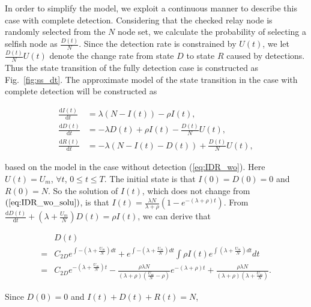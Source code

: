 In order to simplify the model,
we exploit a continuous manner to
describe this case with complete detection.
Considering that the checked relay node
is randomly selected from the $N$ node set,
we calculate the probability of selecting a selfish node
as $\frac{D(t)}{N}$.
Since the detection rate is constrained by $U(t)$,
we let $\frac{D(t)}{N}U(t)$ denote
the change rate from state $D$ to state $R$ caused by detections.
Thus the state transition of the fully detection case
is constructed as Fig.~\ref{fig:ss_dt}.
The approximate model of the state transition in the case with complete detection
will be constructed as
\begin{small}
\begin{equation}
\label{eq:IDR_full}
\begin{aligned}
\frac{\mathrm{d} I(t)}{\mathrm{d} t} &=  \lambda (N-I(t)) - \rho I(t),\\
\frac{\mathrm{d} D(t)}{\mathrm{d} t} &= - \lambda D(t) + \rho I(t) - \frac{D(t)}{N} U(t),\\
\frac{\mathrm{d} R(t)}{\mathrm{d} t} &= - \lambda (N-I(t)-D(t)) + \frac{D(t)}{N} U(t),
\end{aligned}
\end{equation}
\end{small}
based on the model in the case without detection (\ref{eq:IDR_wo}).
Here $U(t) = U_{m}$, $\forall t$, $0 \le t \le T$.
The initial state is that $I(0)=D(0)=0$ and $R(0)=N$.
So the solution of $I(t)$, which does not change from $(\ref{eq:IDR_wo_solu})$,
is that $I(t) = \frac{ \lambda N }{ \lambda + \rho }(1- e^{-(\lambda + \rho)t})$.
From $\frac{\mathrm{d} D(t)}{\mathrm{d} t} + (\lambda + \frac{U_{m}}{N}) D(t)= \rho I(t)$,
we can derive that
\begin{small}
\begin{equation}
\nonumber
\begin{aligned}
& D(t) \\
=& C_{2D} e^{\int -(\lambda + \frac{U_{m}}{N}) dt}
+ e^{\int -(\lambda + \frac{U_{m}}{N}) dt} \int \rho I(t) e^{\int (\lambda + \frac{U_{m}}{N}) dt} dt \\
=& C_{2D} e^{-(\lambda + \frac{U_{m}}{N})t}
- \frac{ \rho \lambda N }{ (\lambda + \rho)(\frac{U_{m}}{N} - \rho) } e^{-(\lambda + \rho)t}
+ \frac{ \rho \lambda N }{ (\lambda + \rho)(\lambda + \frac{U_{m}}{N}) }.
\end{aligned}
\end{equation}
\end{small}
Since $D(0) = 0$ and $I(t) + D(t) + R(t) = N$,
